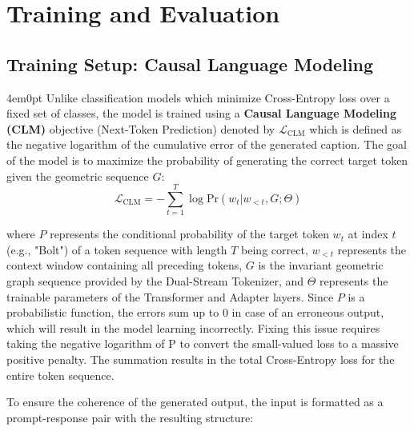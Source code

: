 \section{Training and Evaluation}
	\subsection{Training Setup: Causal Language Modeling}
		\begin{indentedblock}{4em}{0pt}
			Unlike classification models which minimize Cross-Entropy loss over a fixed set of classes, the model is trained using a \textbf{Causal Language Modeling (CLM)} objective (Next-Token Prediction) denoted by $\mathcal{L}_{\text{CLM}}$ which is defined as the negative logarithm of the  cumulative error of the generated caption. The goal of the model is to maximize the probability of generating the correct target token given the geometric sequence $G$:
			\begin{equation}
				\mathcal{L}_{\text{CLM}} = - \sum_{t=1}^{T} \log \text{Pr}(w_t | w_{<t}, G; \Theta)
			\end{equation}
				
			where $P$ represents the conditional probability of the target token $w_t$ at index $t$ (e.g., "Bolt") of a token sequence with length $T$ being correct, $w_{<t}$ represents the context window containing all preceding tokens, $G$ is the invariant geometric graph sequence provided by the Dual-Stream Tokenizer, and $\Theta$ represents the trainable parameters of the Transformer and Adapter layers. Since $P$ is a probabilistic function, the errors sum up to 0 in case of an erroneous output, which will result in the model learning incorrectly. Fixing this issue requires taking the negative logarithm of P to convert the small-valued loss to a massive positive penalty. The summation results in the total Cross-Entropy loss for the entire token sequence.
			
			
			To ensure the coherence of the generated output, the input is formatted as a prompt-response pair with the resulting structure:
			
		\end{indentedblock}
